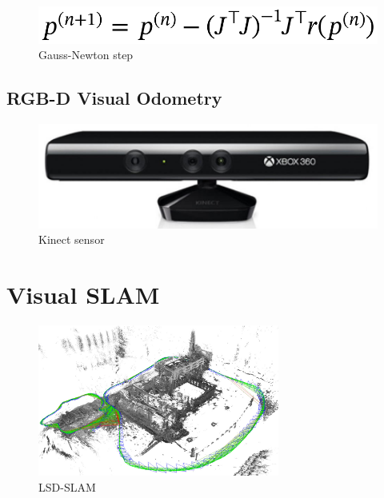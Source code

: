 \begin{figure}[ht]
	\centering
	\includegraphics[width=\linewidth]{assets/img/gauss-newton-step.png}
	\caption{Gauss-Newton step}%
	\label{fig:gauss-newton-step}
\end{figure}

\subsection{RGB-D Visual Odometry}%
\label{sub:rgbd-visual-odometry}

\begin{figure}[ht]
	\centering
	\includegraphics[width=\linewidth]{assets/img/kinect.jpg}
	\caption{Kinect sensor}%
	\label{fig:kinect}
\end{figure}

\section{Visual SLAM}%
\label{sec:v-slam}

\begin{figure}[ht]
	\centering
	\includegraphics[width=\linewidth]{assets/img/lsd-slam.png}
	\caption{LSD-SLAM}%
	\label{fig:lsd-slam}
\end{figure}

